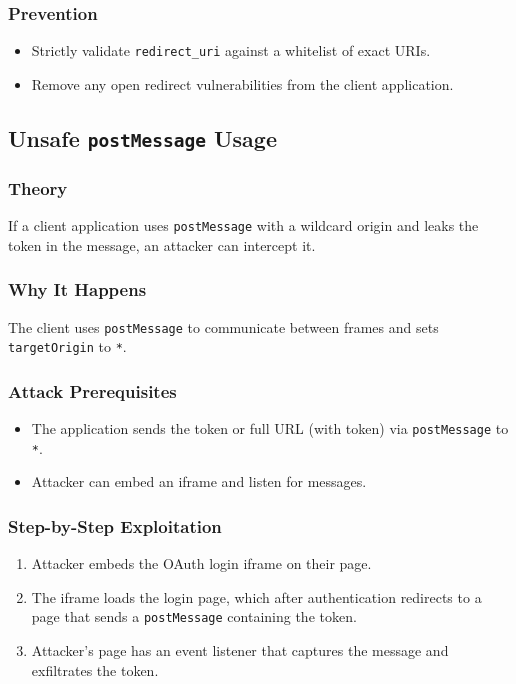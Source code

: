\documentclass[12pt,a4paper]{article}
\begin{document}
\subsubsection{Prevention}
\begin{itemize}
    \item Strictly validate \texttt{redirect\_uri} against a whitelist of exact URIs.
    \item Remove any open redirect vulnerabilities from the client application.
\end{itemize}

\subsection{Unsafe \texttt{postMessage} Usage}
\subsubsection{Theory}
If a client application uses \texttt{postMessage} with a wildcard origin and leaks the token in the message, an attacker can intercept it.

\subsubsection{Why It Happens}
The client uses \texttt{postMessage} to communicate between frames and sets \texttt{targetOrigin} to \texttt{*}.

\subsubsection{Attack Prerequisites}
\begin{itemize}
    \item The application sends the token or full URL (with token) via \texttt{postMessage} to \texttt{*}.
    \item Attacker can embed an iframe and listen for messages.
\end{itemize}

\subsubsection{Step-by-Step Exploitation}
\begin{enumerate}
    \item Attacker embeds the OAuth login iframe on their page.
    \item The iframe loads the login page, which after authentication redirects to a page that sends a \texttt{postMessage} containing the token.
    \item Attacker's page has an event listener that captures the message and exfiltrates the token.
\end{enumerate}
\end{document}
